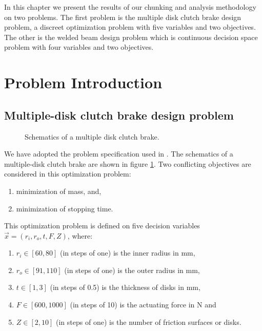 In this chapter we present the results of our chunking and analysis
methodology on two problems. The first problem is the multiple disk clutch
brake design problem, a discreet optimization problem with five variables
and two objectives. The other is the welded beam design problem which is
continuous decision space problem with four variables and two objectives.

\section{Problem Introduction}
\subsection{Multiple-disk clutch brake design problem}


\begin{figure}[ht]\begin{center}
 \caption{Schematics of a multiple disk clutch brake.}
 \label{clutchbrake}
\end{center}\end{figure}


We have adopted the problem specification used in \citep{deb06}. The
schematics of a multiple-disk clutch brake are shown in figure
\ref{clutchbrake}. Two conflicting objectives are considered in this 
optimization problem:
{\allowdisplaybreaks \begin{enumerate}
  \item minimization of mass, and,
  \item minimization of stopping time.
\end{enumerate}
This optimization problem is defined on five decision variables $\vec{x} = (r_i, r_o, t, F, Z)$, where:
\begin{enumerate}
  \item $r_i \in [60, 80]$ (in steps of one) is the inner radius in mm,
  \item $r_o \in [91, 110]$ (in steps of one) is the outer radius in mm,
  \item $t \in [1, 3]$ (in steps of 0.5) is the thickness of disks in mm,
  \item $F \in [600, 1000]$ (in steps of 10) is the actuating force in N and
  \item $Z \in [2, 10]$ (in steps of one) is the number of friction
    surfaces or disks.
\end{enumerate}}

